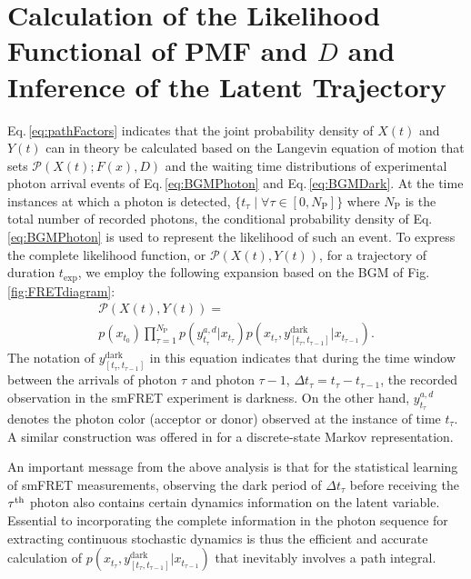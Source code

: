 \documentclass[journal=jpcbfk,manuscript=article,layout=twocolumn,articletitle=true]{achemso}
\begin{document}
\section{Calculation of the Likelihood Functional of PMF and $D$ and Inference of the Latent Trajectory}

Eq.\,\ref{eq:pathFactors} indicates that the joint probability density of $X(t)$ and $Y(t)$ can in theory be calculated based on the Langevin equation of motion that sets $\mathcal{P}(X(t);F(x),D)$ and the waiting time distributions of experimental photon arrival events of Eq.\,\ref{eq:BGMPhoton} and Eq.\,\ref{eq:BGMDark}. At the time instances at which a photon is detected, $\{t_\tau \mid \forall \tau \in [0,N_{\mathrm{P}}]\}$ where $N_{\mathrm{P}}$ is the total number of recorded photons, the conditional probability density of Eq.\,\ref{eq:BGMPhoton} is used to represent the likelihood of such an event. To express the complete likelihood function, or $\mathcal{P}(X(t),Y(t))$, for a trajectory of duration $t_{\mathrm{exp}}$, we employ the following expansion based on the BGM of Fig.\,\ref{fig:FRETdiagram}:
\begin{multline}
\label{eq:pathIterms}
\mathcal{P}(X(t) , Y(t) ) = \\
p(x_{t_0})\prod_{\tau=1}^{N_{\mathrm{P}}}p(y^{a,d}_{t_\tau}|x_{t_\tau})p(x_{t_\tau},y_{[t_\tau,t_{\tau-1}]}^{\text{dark}} | x_{t_{\tau-1}}).
\end{multline}
The notation of $y_{[t_\tau,t_{\tau-1}]}^{\text{dark}}$ in this equation indicates that during the time window between the arrivals of photon $\tau$ and photon $\tau-1$, $\Delta t_{\tau} = t_\tau- t_{\tau-1}$, the recorded observation in the smFRET experiment is darkness.  On the other hand, $y^{a,d}_{t_\tau}$ denotes the photon color (acceptor or donor) observed at the instance of time $t_\tau$. A similar construction was offered in\cite{Cao:2008ha} for a discrete-state Markov representation.

An important message from the above analysis is that for the statistical learning of smFRET measurements, observing the dark period of $\Delta t_{\tau}$ before receiving the $\tau^{\rm th}$ photon also contains certain dynamics information on the latent variable. Essential to incorporating the complete information in the photon sequence for extracting continuous stochastic dynamics is thus the efficient and accurate calculation of $p(x_{t_\tau},y_{[t_\tau,t_{\tau-1}]}^{\text{dark}} | x_{t_{\tau-1}})$ that inevitably involves a path integral. 
\end{document}
